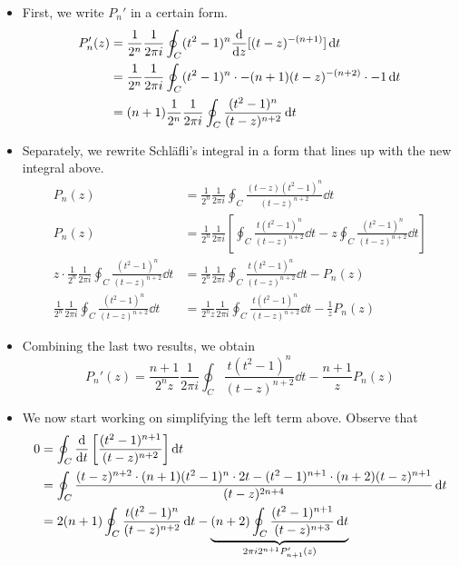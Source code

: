 \documentclass[../finalProject.tex]{subfiles}
\begin{document}
\begin{itemize}
    \begin{itemize}
        \item First, we write $P_n'$ in a certain form.
        \begin{align*}
            P_n'(z) &= \frac{1}{2^n}\frac{1}{2\pi i}\oint_C(t^2-1)^n\dv{z}[(t-z)^{-(n+1)}]\dd{t}\\
            &= \frac{1}{2^n}\frac{1}{2\pi i}\oint_C(t^2-1)^n\cdot -(n+1)(t-z)^{-(n+2)}\cdot -1\dd{t}\\
            &= (n+1)\frac{1}{2^n}\frac{1}{2\pi i}\oint_C\frac{(t^2-1)^n}{(t-z)^{n+2}}\dd{t}
        \end{align*}
        \item Separately, we rewrite Schl\"{a}fli's integral in a form that lines up with the new integral above.
        \begin{align*}
            P_n(z) &= \frac{1}{2^n}\frac{1}{2\pi i}\oint_C\frac{(t-z)(t^2-1)^n}{(t-z)^{n+2}}\dd{t}\\
            P_n(z) &= \frac{1}{2^n}\frac{1}{2\pi i}\left[ \oint_C\frac{t(t^2-1)^n}{(t-z)^{n+2}}\dd{t}-z\oint_C\frac{(t^2-1)^n}{(t-z)^{n+2}}\dd{t} \right]\\
            z\cdot\frac{1}{2^n}\frac{1}{2\pi i}\oint_C\frac{(t^2-1)^n}{(t-z)^{n+2}}\dd{t} &= \frac{1}{2^n}\frac{1}{2\pi i}\oint_C\frac{t(t^2-1)^n}{(t-z)^{n+2}}\dd{t}-P_n(z)\\
            \frac{1}{2^n}\frac{1}{2\pi i}\oint_C\frac{(t^2-1)^n}{(t-z)^{n+2}}\dd{t} &= \frac{1}{2^nz}\frac{1}{2\pi i}\oint_C\frac{t(t^2-1)^n}{(t-z)^{n+2}}\dd{t}-\frac{1}{z}P_n(z)
        \end{align*}
        \item Combining the last two results, we obtain
        \begin{equation*}
            P_n'(z) = \frac{n+1}{2^nz}\frac{1}{2\pi i}\oint_C\frac{t(t^2-1)^n}{(t-z)^{n+2}}\dd{t}-\frac{n+1}{z}P_n(z)
        \end{equation*}
        \item We now start working on simplifying the left term above. Observe that
        \begin{align*}
            0 &= \oint_C\dv{t}\left[ \frac{(t^2-1)^{n+1}}{(t-z)^{n+2}} \right]\dd{t}\\
            &= \oint_C\frac{(t-z)^{n+2}\cdot(n+1)(t^2-1)^n\cdot 2t-(t^2-1)^{n+1}\cdot(n+2)(t-z)^{n+1}}{(t-z)^{2n+4}}\dd{t}\\
            &= 2(n+1)\oint_C\frac{t(t^2-1)^n}{(t-z)^{n+2}}\dd{t}-\underbrace{(n+2)\oint_C\frac{(t^2-1)^{n+1}}{(t-z)^{n+3}}\dd{t}}_{2\pi i2^{n+1}P_{n+1}'(z)}

\end{align*}
\end{itemize}
\end{itemize}
\end{document}
